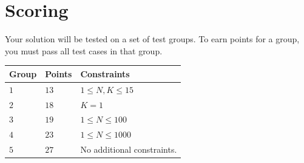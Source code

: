 \section*{Scoring}
Your solution will be tested on a set of test groups.
To earn points for a group, you must pass all test cases in that group.

\noindent
\begin{tabular}{| l | l | p{12cm} |}
  \hline
  \textbf{Group} & \textbf{Points} & \textbf{Constraints} \\ \hline
  $1$    & $13$       & $1 \leq N, K \leq 15$ \\ \hline
  $2$    & $18$       & $K=1$ \\ \hline
  $3$    & $19$       & $1 \leq N \leq 100$ \\ \hline
  $4$    & $23$       & $1 \leq N \leq 1000$ \\ \hline
  $5$    & $27$       & No additional constraints. \\ \hline
\end{tabular}
